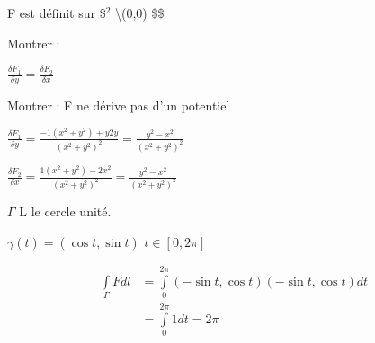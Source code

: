 \documentclass[11pt]{article}
\begin{document}
F est définit sur \$\(^{\text{2}}\) \backslash \lbrace (0,0) \rbrace\$\$ 

Montrer :

\(\frac{\delta F_1}{\delta y} = \frac{\delta F_2}{\delta x}\)

Montrer : F ne dérive pas d'un potentiel

\(\frac{\delta F_1}{\delta y} = \frac{-1(x^2+y^2)+y 2y}{(x^2+y^2)^2} = \frac{y^2-x^2}{(x^2+y^2)^2}\)

\(\frac{\delta F_2}{\delta x} = \frac{1(x^2+y^2)-2x^2}{(x^2+y^2)^2} = \frac{y^2-x^2}{(x^2+y^2)^2}\)


\(\Gamma\) L le cercle unité.

\(\gamma (t) = (\cos t, \sin t)\) \(t \in [0,2\pi]\)

\begin{align*}
\int\limits_{\Gamma} F dl &= \int\limits_0^{2\pi} (-\sin t, \cos t) (-\sin t, \cos t) dt\\
&= \int\limits_0^{2\pi} 1 dt = 2 \pi
\end{align*}
\end{document}

